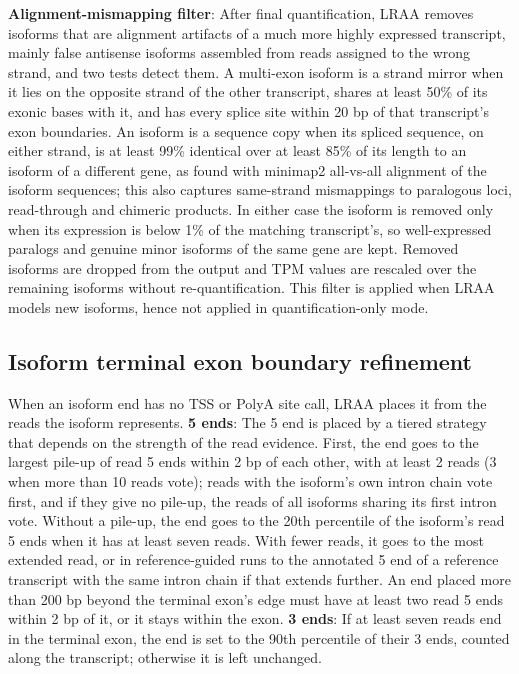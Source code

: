 \textbf{Alignment-mismapping filter}: After final quantification, LRAA removes isoforms that are alignment artifacts of a much more highly expressed transcript, mainly false antisense isoforms assembled from reads assigned to the wrong strand, and two tests detect them. A multi-exon isoform is a strand mirror when it lies on the opposite strand of the other transcript, shares at least 50\% of its exonic bases with it, and has every splice site within 20 bp of that transcript's exon boundaries. An isoform is a sequence copy when its spliced sequence, on either strand, is at least 99\% identical over at least 85\% of its length to an isoform of a different gene, as found with minimap2 all-vs-all alignment of the isoform sequences; this also captures same-strand mismappings to paralogous loci, read-through and chimeric products. In either case the isoform is removed only when its expression is below 1\% of the matching transcript's, so well-expressed paralogs and genuine minor isoforms of the same gene are kept. Removed isoforms are dropped from the output and TPM values are rescaled over the remaining isoforms without re-quantification. This filter is applied when LRAA models new isoforms, hence not applied in quantification-only mode.

\subsection{Isoform terminal exon boundary refinement}\label{isoform-terminal-exon-boundary-refinement}

When an isoform end has no TSS or PolyA site call, LRAA places it from the reads the isoform represents. \textbf{5\p{} ends}: The 5\p{} end is placed by a tiered strategy that depends on the strength of the read evidence. First, the end goes to the largest pile-up of read 5\p{} ends within 2 bp of each other, with at least 2 reads (3 when more than 10 reads vote); reads with the isoform's own intron chain vote first, and if they give no pile-up, the reads of all isoforms sharing its first intron vote. Without a pile-up, the end goes to the 20th percentile of the isoform's read 5\p{} ends when it has at least seven reads. With fewer reads, it goes to the most extended read, or in reference-guided runs to the annotated 5\p{} end of a reference transcript with the same intron chain if that extends further. An end placed more than 200 bp beyond the terminal exon's edge must have at least two read 5\p{} ends within 2 bp of it, or it stays within the exon. \textbf{3\p{} ends}: If at least seven reads end in the terminal exon, the end is set to the 90th percentile of their 3\p{} ends, counted along the transcript; otherwise it is left unchanged.

